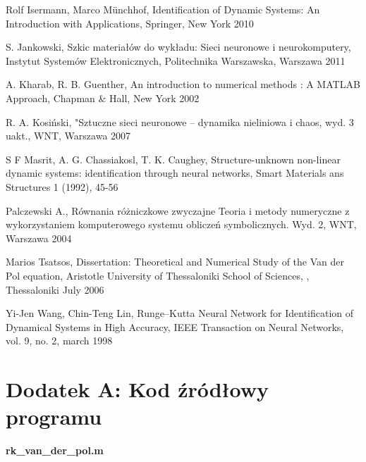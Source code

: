 \begin{thebibliography}{widest-label}
 Rolf Isermann, Marco Münchhof, Identification of Dynamic Systems: An Introduction with Applications, Springer, New York 2010

 S. Jankowski, Szkic materiałów do wykładu: Sieci neuronowe i neurokomputery, Instytut Systemów Elektronicznych,
Politechnika Warszawska, Warszawa 2011

 A. Kharab, R. B. Guenther, An introduction to numerical methods : A MATLAB Approach, Chapman \& Hall, New York 2002

 R. A. Kosiński, "Sztuczne sieci neuronowe – dynamika nieliniowa i chaos, wyd. 3 uakt., WNT, Warszawa 2007

 S F Masrit, A. G. Chassiakosl, T. K. Caughey, Structure-unknown non-linear dynamic systems: identification through neural networks, Smart Materials ans Structures 1 (1992), 45-56

 Palczewski A., Równania różniczkowe zwyczajne
Teoria i metody numeryczne z wykorzystaniem komputerowego systemu obliczeń symbolicznych. Wyd. 2, WNT, Warszawa 2004

 Marios Tsatsos, Dissertation: Theoretical and Numerical Study of the Van der Pol equation, Aristotle University of Thessaloniki School of Sciences, , Thessaloniki July 2006

 Yi-Jen Wang, Chin-Teng Lin, Runge–Kutta Neural Network for Identification of Dynamical Systems in High Accuracy, IEEE Transaction on Neural Networks, vol. 9, no. 2, march 1998

\end{thebibliography}

\clearpage
{}
\section*{Dodatek A: Kod źródłowy programu}

\textbf{rk\_van\_der\_pol.m}


